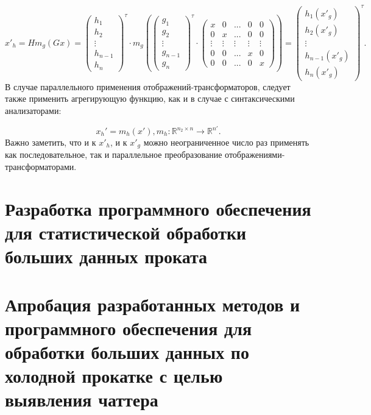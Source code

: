 $$x'_h = H m_g (Gx) =
\left(
\begin{array}{c}
h_1 \\
h_2\\
\vdots \\
h_{n-1}\\ 
h_{n}
\end{array}
\right)^{\tau}
\cdot
m_g
\left(\left(
\begin{array}{c}
g_1 \\
g_2\\
\vdots \\
g_{n-1}\\ 
g_{n}
\end{array}
\right)^{\tau}
\cdot\left(
\begin{array}{ccccc}
x & 0 & ... &  0 & 0 \\
0 & x & ... & 0 & 0 \\
\vdots & \vdots & \vdots & \vdots & \vdots \\
0 & 0 & ... & x & 0 \\
0 & 0 & ... & 0 & x
\end{array}
\right) \right)  = 
\left(
\begin{array}{c}
h_1(x'_g) \\
h_2(x'_g)\\
\vdots \\
h_{n-1}(x'_g)\\ 
h_n(x'_g)
\end{array}
\right)^{\tau}.
$$ 
В случае параллельного применения отображений-трансформаторов, следует также применить агрегирующую функцию, как и в случае с синтаксическими анализаторами:

$$x_{h}' = m_h(x'), m_h : \mathbb{R}^{n_2 \times n} \to \mathbb{R}^{n'}.$$
Важно заметить, что и к $x'_h$, и к $x'_g$ можно неограниченное число раз применять как последовательное, так и параллельное преобразование отображениями-трансформаторами.

\section{Разработка программного обеспечения для статистической обработки больших данных проката}

\newpage
\section{Апробация разработанных методов и программного обеспечения для обработки больших данных по холодной прокатке с целью выявления чаттера}
